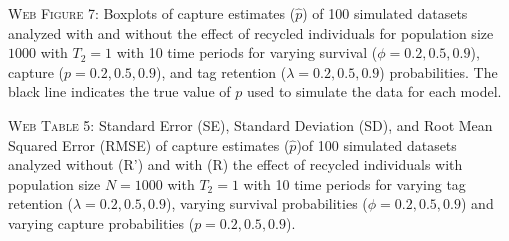 \documentclass[]{article}
\begin{document}
\textsc{Web Figure 7:} Boxplots of capture estimates (\(\hat{p}\)) of
100 simulated datasets analyzed with and without the effect of recycled
individuals for population size \(1000\) with \(T_2=1\) with 10 time
periods for varying survival (\(\phi=0.2,0.5,0.9\)), capture
(\(p=0.2,0.5,0.9\)), and tag retention (\(\lambda=0.2,0.5,0.9\))
probabilities. The black line indicates the true value of \(p\) used to
simulate the data for each model.

\textsc{Web Table 5:} Standard Error (SE), Standard Deviation (SD), and
Root Mean Squared Error (RMSE) of capture estimates (\(\hat{p}\))of 100
simulated datasets analyzed without (R') and with (R) the effect of
recycled individuals with population size \(N=1000\) with \(T_2=1\) with
10 time periods for varying tag retention (\(\lambda=0.2,0.5,0.9\)),
varying survival probabilities (\(\phi=0.2,0.5,0.9\)) and varying
capture probabilities (\(p=0.2,0.5,0.9\)).
\end{document}
